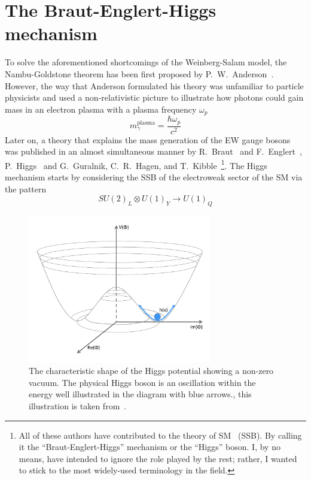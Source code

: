\section{The Braut-Englert-Higgs mechanism \label{Higgsmech}}
To solve the aforementioned shortcomings of the Weinberg-Salam model, the Nambu-Goldstone theorem has been first proposed by P.~W.~Anderson~\cite{PhysRev.130.439}. However, the way that Anderson formulated his theory was unfamiliar to particle physicists and used a non-relativistic picture to illustrate how photons could gain mass in an electron plasma with a plasma frequency $\omega_{p}$ 
\begin{equation}
	m_\gamma^{\mathrm{plasma}} =\frac{\hbar \omega_p}{c^2}
\end{equation}
Later on, a theory that explains the mass generation of the EW gauge bosons was published in an almost simultaneous manner by R.~Braut~ and F.~Englert~\cite{PhysRevLett.13.321}, P.~Higgs~\cite{PhysRevLett.13.508,HIGGS1964132} and G.~Guralnik, C.~R.~Hagen, and T.~Kibble~\cite{PhysRevLett.13.585,Guralnik:2009jd}\footnote{All of these authors have contributed to the theory of SM ~(SSB). By calling it the ``Braut-Englert-Higgs'' mechanism or the ``Higgs'' boson. I, by no means, have intended to ignore the role played by the rest; rather, I wanted to stick to the most widely-used terminology in the field.}.
The Higgs mechanism starts by considering the SSB of the electroweak sector of the SM via the pattern
\begin{equation}
	SU(2)_L \otimes U(1)_Y \longrightarrow U(1)_{Q} 
\end{equation}
\begin{figure}[t!]
	\begin{center}
		\includegraphics[width=8cm]{figures/HiggsPotential}
		\caption{The characteristic shape of the Higgs potential showing a non-zero vacuum. The physical Higgs boson is an oscillation within the energy well illustrated in the diagram with blue arrows., this illustration is taken from~\cite{Erler:2019hds}. \label{fig:higgs_hat} }
	\end{center}
\end{figure}

